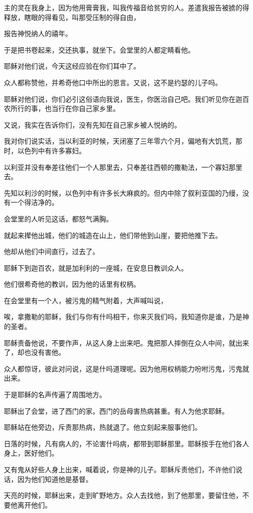\documentclass[12pt,oneside]{book}
\begin{document}
主的灵在我身上，因为他用膏膏我，叫我传福音给贫穷的人。差遣我报告被掳的得释放，瞎眼的得看见，叫那受压制的得自由，

报告神悦纳人的禧年。

于是把书卷起来，交还执事，就坐下。会堂里的人都定睛看他。

耶稣对他们说，今天这经应验在你们耳中了。

众人都称赞他，并希奇他口中所出的恩言。又说，这不是约瑟的儿子吗。

耶稣对他们说，你们必引这俗语向我说，医生，你医治自己吧。我们听见你在迦百农所行的事，也当行在你自己家乡里。

又说，我实在告诉你们，没有先知在自己家乡被人悦纳的。

我对你们说实话，当以利亚的时候，天闭塞了三年零六个月，偏地有大饥荒，那时，以色列中有许多寡妇。

以利亚并没有奉差往他们一个人那里去，只奉差往西顿的撒勒法，一个寡妇那里去。

先知以利沙的时候，以色列中有许多长大麻疯的。但内中除了叙利亚国的乃缦，没有一个得洁净的。

会堂里的人听见这话，都怒气满胸。

就起来撵他出城，他们的城造在山上，他们带他到山崖，要把他推下去。

他却从他们中间直行，过去了。

耶稣下到迦百农，就是加利利的一座城，在安息日教训众人。

他们很希奇他的教训，因为他的话里有权柄。

在会堂里有一个人，被污鬼的精气附着，大声喊叫说，

唉，拿撒勒的耶稣，我们与你有什吗相干，你来灭我们吗，我知道你是谁，乃是神的圣者。

耶稣责备他说，不要作声，从这人身上出来吧。鬼把那人摔倒在众人中间，就出来了，却也没有害他。

众人都惊讶，彼此对问说，这是什吗道理呢。因为他用权柄能力吩咐污鬼，污鬼就出来。

于是耶稣的名声传遍了周围地方。

耶稣出了会堂，进了西门的家。西门的岳母害热病甚重。有人为他求耶稣。

耶稣站在他旁边，斥责那热病，热就退了。他立刻起来服事他们。

日落的时候，凡有病人的，不论害什吗病，都带到耶稣那里。耶稣按手在他们各人身上，医好他们。

又有鬼从好些人身上出来，喊着说，你是神的儿子。耶稣斥责他们，不许他们说话，因为他们知道他是基督。

天亮的时候，耶稣出来，走到旷野地方。众人去找他，到了他那里，要留住他，不要他离开他们。
\end{document}
